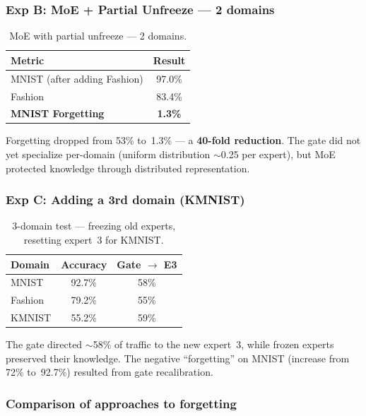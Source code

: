 \documentclass[11pt,a4paper]{report}
\begin{document}
\subsubsection*{Exp B: MoE + Partial Unfreeze --- 2 domains}

\begin{table}[h]
\centering
\caption{MoE with partial unfreeze --- 2 domains.}
\begin{tabular}{l c}
\hline
\textbf{Metric} & \textbf{Result} \\
\hline
MNIST (after adding Fashion) & 97.0\% \\
Fashion & 83.4\% \\
\textbf{MNIST Forgetting} & \textbf{1.3\%} \\
\hline
\end{tabular}
\end{table}

Forgetting dropped from 53\% to~1.3\% --- a \textbf{40-fold reduction}. The gate did not yet specialize per-domain (uniform distribution $\sim$0.25 per expert), but MoE protected knowledge through distributed representation.

\subsubsection*{Exp C: Adding a 3rd domain (KMNIST)}

\begin{table}[h]
\centering
\caption{3-domain test --- freezing old experts, resetting expert~3 for KMNIST.}
\begin{tabular}{l c c}
\hline
\textbf{Domain} & \textbf{Accuracy} & \textbf{Gate $\to$ E3} \\
\hline
MNIST & 92.7\% & 58\% \\
Fashion & 79.2\% & 55\% \\
KMNIST & 55.2\% & 59\% \\
\hline
\end{tabular}
\end{table}

The gate directed $\sim$58\% of traffic to the new expert~3, while frozen experts preserved their knowledge. The negative ``forgetting'' on MNIST (increase from 72\% to~92.7\%) resulted from gate recalibration.

\subsubsection*{Comparison of approaches to forgetting}
\end{document}
